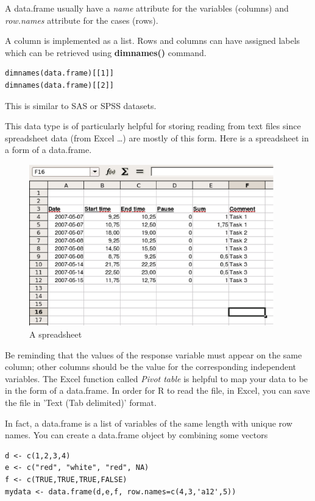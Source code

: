 A data.frame usually have a {\it name} attribute for the variables
(columns) and {\it row.names} attribute for the cases (rows). 

A column is implemented as a list.  Rows and columns can have assigned
labels which can be retrieved using {\bf dimnames()} command.
\begin{lstlisting}
dimnames(data.frame)[[1]]
dimnames(data.frame)[[2]]
\end{lstlisting}
This is similar to SAS or SPSS datasets.

This data type is of particularly helpful for storing reading from
text files since spreadsheet data (from Excel …) are mostly of this
form. Here is a spreadsheet in a form of a data.frame.
\begin{figure}[htb]
  \centerline{\includegraphics[height=7cm]{./images/data_frame.eps}}
  \caption{A spreadsheet}\label{fig:data_frame}
\end{figure}

Be reminding that the values of the response variable must appear on
the same column; other columns should be the value for the
corresponding independent variables. The Excel function called
{\it Pivot table} is helpful to map your data to be in the form of a
data.frame. In order for R to read the file, in Excel, you can save
the file in  'Text (Tab delimited)' format.

In fact, a data.frame is a list of variables of the same length with
unique row names. You can create a data.frame object by combining some vectors
\begin{lstlisting}
d <- c(1,2,3,4)
e <- c("red", "white", "red", NA)
f <- c(TRUE,TRUE,TRUE,FALSE)
mydata <- data.frame(d,e,f, row.names=c(4,3,'a12',5))
\end{lstlisting}

